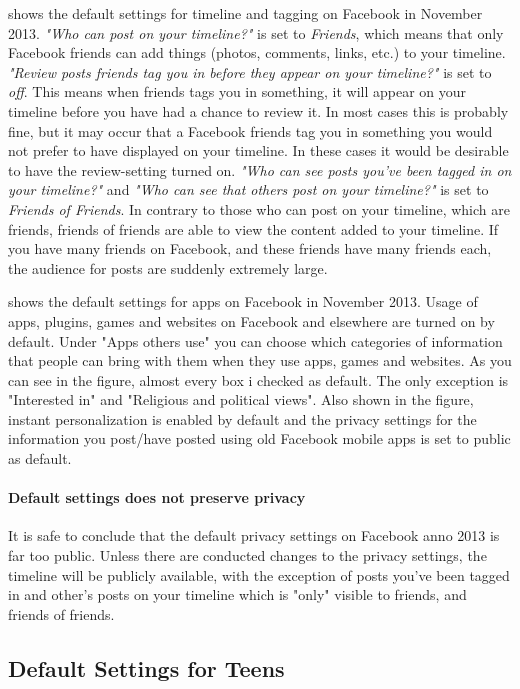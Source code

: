  shows the default settings for timeline and tagging on Facebook in November 2013. \textit{"Who can post on your timeline?"} is set to \textit{Friends}, which means that only Facebook friends can add things (photos, comments, links, etc.) to your timeline. \textit{"Review posts friends tag you in before they appear on your timeline?" }is set to\textit{ off}. This means when friends tags you in something, it will appear on your timeline before you have had a chance to review it. In most cases this is probably fine, but it may occur that a Facebook friends tag you in something you would not prefer to have displayed on your timeline. In these cases it would be desirable to have the review-setting turned on. \textit{"Who can see posts you've been tagged in on your timeline?"} and \textit{"Who can see that others post on your timeline?"} is set to \textit{Friends of Friends}. In contrary to those who can post on your timeline, which are friends, friends of friends are able to view the content added to your timeline. If you have many friends on Facebook, and these friends have many friends each, the audience for posts are suddenly extremely large. 

 shows the default settings for apps on Facebook in November 2013. Usage of apps, plugins, games and websites on Facebook and elsewhere are turned on by default. Under "Apps others use" you can choose which categories of information that people can bring with them when they use apps, games and websites. As you can see in the figure, almost every box i checked as default. The only exception is "Interested in" and "Religious and political views". Also shown in the figure, instant personalization is enabled by default and the privacy settings for the information you post/have posted using old Facebook mobile apps is set to public as default. 

\paragraph{Default settings does not preserve privacy} It is safe to conclude that the default privacy settings on Facebook anno 2013 is far too public. Unless there are conducted changes to the privacy settings, the timeline will be publicly available, with the exception of posts you've been tagged in and other's posts on your timeline which is "only" visible to friends, and friends of friends. 

\subsection{Default Settings for Teens}

